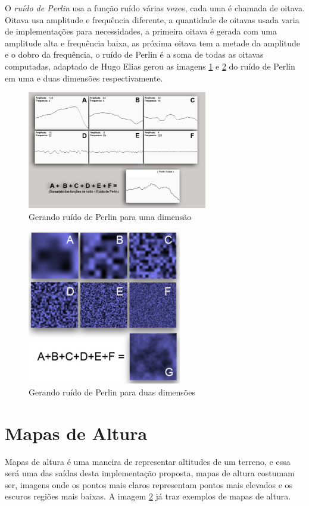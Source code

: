 O \textit{ruído de Perlin} usa a função ruído várias vezes, cada uma é chamada
de oitava. Oitava usa amplitude e frequência diferente, a quantidade de oitavas
usada varia de implementações para necessidades, a primeira oitava é gerada com uma
amplitude alta e frequência baixa, as próxima oitava tem a metade da amplitude e 
o dobro da frequência, o ruído de Perlin é a soma de todas as oitavas computadas,
adaptado de Hugo Elias \cite{carli2012canion} gerou as imagens
\ref{fig:perlin1d} e \ref{fig:perlin2d} do ruído de Perlin em uma e duas
dimensões respectivamente.
\begin{figure}[H]
    \centering
    \includegraphics[width=0.7\textwidth]{figuras/perlin1d.png}
    \caption{Gerando ruído de Perlin para uma dimensão}
    \label{fig:perlin1d}
\end{figure}
\begin{figure}[H]
    \centering
    \includegraphics[width=0.6\textwidth]{figuras/perlin2d.png}
    \caption{Gerando ruído de Perlin para duas dimensões}
    \label{fig:perlin2d}
\end{figure}

\section{Mapas de Altura}
Mapas de altura é uma maneira de representar altitudes de um terreno, e essa
será uma das saídas desta implementação proposta, mapas de altura costumam ser, imagens
onde os pontos mais claros representam pontos mais elevados e os escuros regiões mais baixas.
A imagem \ref{fig:perlin2d} já traz exemplos de mapas de altura.

